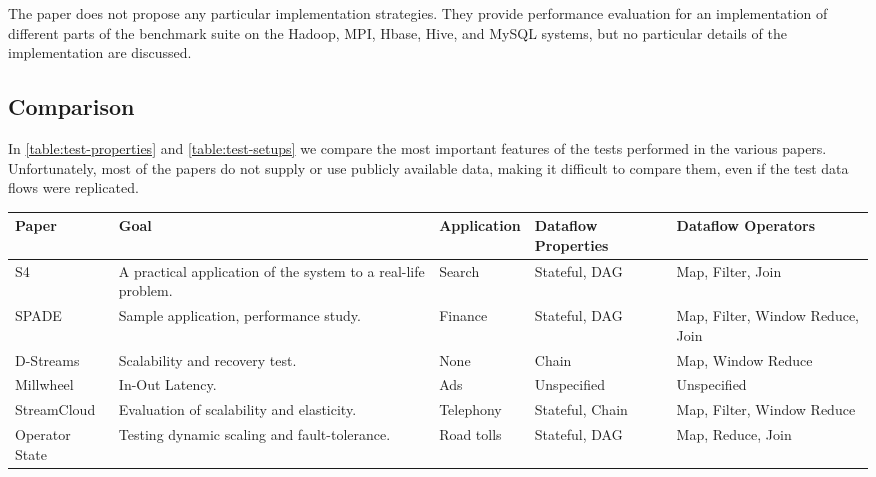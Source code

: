 The paper does not propose any particular implementation strategies. They provide performance evaluation for an implementation of different parts of the benchmark suite on the Hadoop, MPI, Hbase, Hive, and MySQL systems, but no particular details of the implementation are discussed.

\subsection{Comparison}
In \autoref{table:test-properties} and \autoref{table:test-setups} we compare the most important features of the tests performed in the various papers. Unfortunately, most of the papers do not supply or use publicly available data, making it difficult to compare them, even if the test data flows were replicated.

\begin{table}[H]
  \centering
  {
    \scriptsize
    \hspace*{-1cm}
    \begin{tabular}{|p{3cm}|p{4cm}|p{3cm}|p{2.5cm}|p{2.5cm}|}
      \hline
      Paper & Goal & Application & Dataflow Properties & Dataflow Operators
      \\\hline
      
      S4\cite{s4}
      & A practical application of the system to a real-life problem.
      & Search
      & Stateful, DAG
      & Map, Filter, Join
      \\\hline
      
      SPADE\cite{spade}
      & Sample application, performance study.
      & Finance
      & Stateful, DAG
      & Map, Filter, Window Reduce, Join
      \\\hline

      D-Streams\cite{discretized}
      & Scalability and recovery test.
      & None
      & Chain
      & Map, Window Reduce
      \\\hline

      Millwheel\cite{millwheel}
      & In-Out Latency.
      & Ads
      & Unspecified
      & Unspecified
      \\\hline

      StreamCloud\cite{streamcloud}
      & Evaluation of scalability and elasticity.
      & Telephony
      & Stateful, Chain
      & Map, Filter, Window Reduce
      \\\hline

      Operator State\cite{integrating}
      & Testing dynamic scaling and fault-tolerance.
      & Road tolls
      & Stateful, DAG
      & Map, Reduce, Join
      \\\hline


\end{tabular}}
\end{table}
